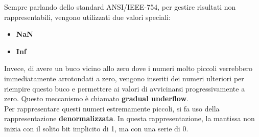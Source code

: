 \documentclass{article}
\begin{document}
Sempre parlando dello standard ANSI/IEEE-754, per gestire risultati non rappresentabili, 
vengono utilizzati due valori speciali:
\begin{itemize}
    \item \textbf{NaN} 
    \item \textbf{Inf}
\end{itemize}
Invece, di avere un buco vicino allo zero dove i numeri molto piccoli
verrebbero immediatamente arrotondati a zero, vengono inseriti dei numeri ulteriori per
riempire questo buco e permettere ai valori di avvicinarsi progressivamente a zero.
Questo meccanismo è chiamato \textbf{gradual underflow}.\\ 
Per rappresentare questi numeri estremamente piccoli, si fa uso della
rappresentazione \textbf{denormalizzata}. In questa rappresentazione, la
mantissa  non inizia con il solito bit implicito di 1, ma  con una serie di 0.
\end{document}
